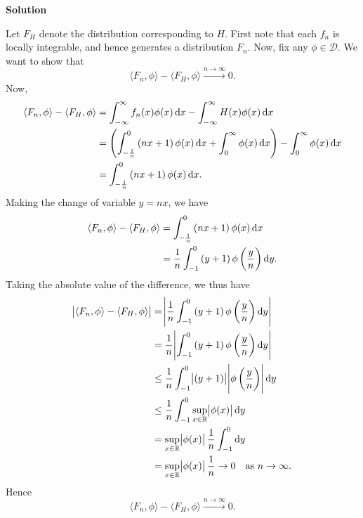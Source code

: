 \documentclass{article}
\begin{document}
\textbf{Solution}

Let $F_H$ denote the distribution corresponding to $H$. First note that
each $f_n$ is locally integrable, and hence generates a distribution
$F_n$. Now, fix any $\phi \in \mathcal{D}$. We want to show that
%
\begin{equation*}
    \langle F_n, \phi \rangle - \langle F_H, \phi \rangle \xrightarrow{n \to \infty} 0
    .
\end{equation*}
%
Now,
%
\begin{align*}
    \langle F_n, \phi \rangle - \langle F_H, \phi \rangle
        &= \int_{- \infty}^\infty f_n(x) \phi(x) \dif x
            - \int_{- \infty}^\infty H(x) \phi(x) \dif x \\
        &= \del{
                \int_{- \frac{1}{n}}^0 \del{n x + 1} \phi(x) \dif x
                + \int_{0}^\infty \phi(x) \dif x
            }
            - \int_{0}^\infty \phi(x) \dif x \\
        &= \int_{- \frac{1}{n}}^0 \del{n x + 1} \phi(x) \dif x
        .
\end{align*}
%
Making the change of variable $y = n x$, we have
%
\begin{align*}
    \langle F_n, \phi \rangle - \langle F_H, \phi \rangle
        &= \int_{- \frac{1}{n}}^0 \del{n x + 1} \phi(x) \dif x \\
        &= \frac{1}{n} \int_{-1}^0 \del{y + 1} \phi \del{\frac{y}{n}} \dif y
        .
\end{align*}
%
Taking the absolute value of the difference, we thus have
%
\begin{align*}
    \envert{\langle F_n, \phi \rangle - \langle F_H, \phi \rangle}
        &= \envert{\frac{1}{n} \int_{-1}^0 \del{y + 1} \phi \del{\frac{y}{n}} \dif y} \\
        &= \frac{1}{n} \envert{\int_{-1}^0 \del{y + 1} \phi \del{\frac{y}{n}} \dif y} \\
        &\leq \frac{1}{n} \int_{-1}^0 \envert{\del{y + 1}} \envert{\phi \del{\frac{y}{n}}} \dif y \\
        &\leq \frac{1}{n} \int_{-1}^0 \sup_{x \in \mathbb{R}} \envert{\phi(x)} \dif y \\
        &= \sup_{x \in \mathbb{R}}\envert{\phi(x)} \frac{1}{n} \int_{-1}^0  \dif y \\
        &= \sup_{x \in \mathbb{R}}\envert{\phi(x)} \frac{1}{n} \to 0 \quad \text{as } n \to \infty
        .
\end{align*}
%
Hence
%
\begin{equation*}
    \langle F_n, \phi \rangle - \langle F_H, \phi \rangle \xrightarrow{n \to \infty} 0
    .
\end{equation*}
\end{document}
